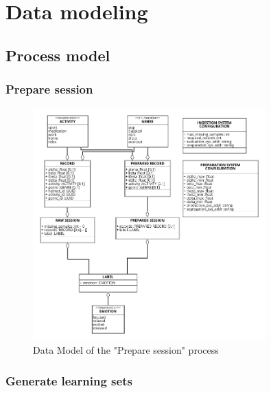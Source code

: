 \section{Data modeling}
\label{sec:data_modeling}   

\subsection{Process model}

\subsubsection{Prepare session}
\label{sec:data_prepare_session}

\begin{figure}[H]
\centering
\includegraphics[width=0.8\textwidth]{figures/Data Model - Prepare Session.png}
\caption{Data Model of the "Prepare session" process}
\label{fig:data_prepare_session}
\end{figure}

\subsubsection{Generate learning sets}
\label{sec:data_generate_learning_sets}

